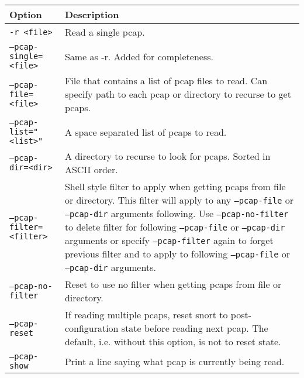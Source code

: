 \documentclass[english]{report}
\begin{document}
\begin{center}
\begin{tabular}{| l | p{4.5in} |}

\hline
\textbf{Option} & \textbf{Description}\\
\hline 

\hline 
\texttt{-r <file>} &

Read a single pcap. \\

\hline
\texttt{--pcap-single=<file>} &

Same as -r.  Added for completeness. \\

\hline
\texttt{--pcap-file=<file>} &

File that contains a list of pcap files to read.  Can specify path to each
pcap or directory to recurse to get pcaps. \\

\hline
\texttt{--pcap-list="<list>"} &

A space separated list of pcaps to read. \\

\hline
\texttt{--pcap-dir=<dir>} &

A directory to recurse to look for pcaps.  Sorted in ASCII order. \\

\hline
\texttt{--pcap-filter=<filter>} &

Shell style filter to apply when getting pcaps from file or directory.  This
filter will apply to any \texttt{--pcap-file} or \texttt{--pcap-dir} arguments
following.  Use \texttt{--pcap-no-filter} to delete filter for following
\texttt{--pcap-file} or \texttt{--pcap-dir} arguments or specify
\texttt{--pcap-filter} again to forget previous filter and to apply to
following \texttt{--pcap-file} or \texttt{--pcap-dir} arguments. \\

\hline
\texttt{--pcap-no-filter} &

Reset to use no filter when getting pcaps from file or directory. \\

\hline
\texttt{--pcap-reset} &

If reading multiple pcaps, reset snort to post-configuration state before
reading next pcap.  The default, i.e. without this option, is not to reset
state. \\

\hline
\texttt{--pcap-show} &

Print a line saying what pcap is currently being read. \\

\hline
\end{tabular}
\end{center}
\end{document}
